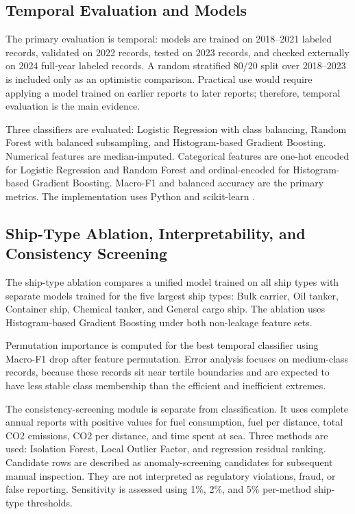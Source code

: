 \documentclass[jmse,article,submit,pdftex,oneauthor]{Definitions/mdpi}
\begin{document}
\subsection{Temporal Evaluation and Models}

The primary evaluation is temporal: models are trained on 2018--2021 labeled records, validated on 2022 records, tested on 2023 records, and checked externally on 2024 full-year labeled records. A random stratified 80/20 split over 2018--2023 is included only as an optimistic comparison. Practical use would require applying a model trained on earlier reports to later reports; therefore, temporal evaluation is the main evidence.

Three classifiers are evaluated: Logistic Regression with class balancing, Random Forest with balanced subsampling, and Histogram-based Gradient Boosting. Numerical features are median-imputed. Categorical features are one-hot encoded for Logistic Regression and Random Forest and ordinal-encoded for Histogram-based Gradient Boosting. Macro-F1 and balanced accuracy are the primary metrics. The implementation uses Python and scikit-learn \cite{scikit_learn}.

\subsection{Ship-Type Ablation, Interpretability, and Consistency Screening}

The ship-type ablation compares a unified model trained on all ship types with separate models trained for the five largest ship types: Bulk carrier, Oil tanker, Container ship, Chemical tanker, and General cargo ship. The ablation uses Histogram-based Gradient Boosting under both non-leakage feature sets.

Permutation importance is computed for the best temporal classifier using Macro-F1 drop after feature permutation. Error analysis focuses on medium-class records, because these records sit near tertile boundaries and are expected to have less stable class membership than the efficient and inefficient extremes.

The consistency-screening module is separate from classification. It uses complete annual reports with positive values for fuel consumption, fuel per distance, total CO2 emissions, CO2 per distance, and time spent at sea. Three methods are used: Isolation Forest, Local Outlier Factor, and regression residual ranking. Candidate rows are described as anomaly-screening candidates for subsequent manual inspection. They are not interpreted as regulatory violations, fraud, or false reporting. Sensitivity is assessed using 1\%, 2\%, and 5\% per-method ship-type thresholds.
\end{document}
